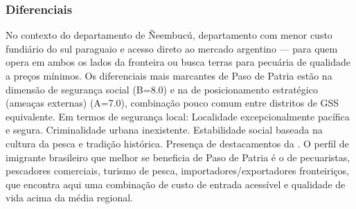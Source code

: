 \subsubsection*{Diferenciais}\label{dif-paso-de-patria-1211}
No contexto do departamento de Ñeembucú, departamento com menor custo fundiário do sul paraguaio e acesso direto ao mercado argentino — para quem opera em ambos os lados da fronteira ou busca terras para pecuária de qualidade a preços mínimos. Os diferenciais mais marcantes de Paso de Patria estão na dimensão de segurança social (B=8.0) e na de posicionamento estratégico (ameaças externas) (A=7.0), combinação pouco comum entre distritos de GSS equivalente. Em termos de segurança local: Localidade excepcionalmente pacífica e segura. Criminalidade urbana inexistente. Estabilidade social baseada na cultura da pesca e tradição histórica. Presença de destacamentos da . O perfil de imigrante brasileiro que melhor se beneficia de Paso de Patria é o de pecuaristas, pescadores comerciais, turismo de pesca, importadores/exportadores fronteiriços, que encontra aqui uma combinação de custo de entrada acessível e qualidade de vida acima da média regional.
